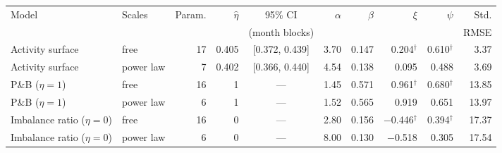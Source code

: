 \begin{tabular}{llrrcrrrrr}
\toprule
Model & Scales & Param. & \(\hat\eta\) & 95\% CI & \(\alpha\) & \(\beta\) & \(\xi\) & \(\psi\) & Std. \\
 &  &  &  & (month blocks) &  &  &  &  & RMSE \\
\midrule
Activity surface & free & 17 & 0.405 & [0.372, 0.439] & 3.70 & 0.147 & 0.204\(^\dagger\) & 0.610\(^\dagger\) & 3.37 \\
Activity surface & power law & 7 & 0.402 & [0.366, 0.440] & 4.54 & 0.138 & 0.095 & 0.488 & 3.69 \\
\addlinespace
P\&B (\(\eta=1\)) & free & 16 & 1 & --- & 1.45 & 0.571 & 0.961\(^\dagger\) & 0.680\(^\dagger\) & 13.85 \\
P\&B (\(\eta=1\)) & power law & 6 & 1 & --- & 1.52 & 0.565 & 0.919 & 0.651 & 13.97 \\
\addlinespace
Imbalance ratio (\(\eta=0\)) & free & 16 & 0 & --- & 2.80 & 0.156 & $-$0.446\(^\dagger\) & 0.394\(^\dagger\) & 17.37 \\
Imbalance ratio (\(\eta=0\)) & power law & 6 & 0 & --- & 8.00 & 0.130 & $-$0.518 & 0.305 & 17.54 \\
\bottomrule
\end{tabular}
